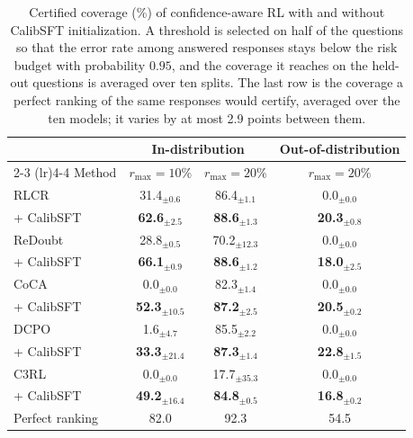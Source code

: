 \begin{table}[t]
    \centering
    \caption{Certified coverage (\%) of confidence-aware RL with and without CalibSFT initialization. A threshold is selected on half of the questions so that the error rate among answered responses stays below the risk budget with probability $0.95$, and the coverage it reaches on the held-out questions is averaged over ten splits. The last row is the coverage a perfect ranking of the same responses would certify, averaged over the ten models; it varies by at most 2.9 points between them.}
    \label{tab:risk_control}
    \footnotesize
    \setlength{\tabcolsep}{5pt}
    \begin{tabular}{lccc}
        \toprule
        & \multicolumn{2}{c}{In-distribution} & Out-of-distribution \\
        \cmidrule(lr){2-3} \cmidrule(lr){4-4}
        Method & $r_{\max}=10\%$ & $r_{\max}=20\%$ & $r_{\max}=20\%$ \\
        \midrule
        RLCR & 31.4$_{\pm 0.6}$ & 86.4$_{\pm 1.1}$ & 0.0$_{\pm 0.0}$ \\
        \rowcolor{calibrow} + CalibSFT & \textbf{62.6$_{\pm 2.5}$} & \textbf{88.6$_{\pm 1.3}$} & \textbf{20.3$_{\pm 0.8}$} \\
        \midrule
        ReDoubt & 28.8$_{\pm 0.5}$ & 70.2$_{\pm 12.3}$ & 0.0$_{\pm 0.0}$ \\
        \rowcolor{calibrow} + CalibSFT & \textbf{66.1$_{\pm 0.9}$} & \textbf{88.6$_{\pm 1.2}$} & \textbf{18.0$_{\pm 2.5}$} \\
        \midrule
        CoCA & 0.0$_{\pm 0.0}$ & 82.3$_{\pm 1.4}$ & 0.0$_{\pm 0.0}$ \\
        \rowcolor{calibrow} + CalibSFT & \textbf{52.3$_{\pm 10.5}$} & \textbf{87.2$_{\pm 2.5}$} & \textbf{20.5$_{\pm 0.2}$} \\
        \midrule
        DCPO & 1.6$_{\pm 4.7}$ & 85.5$_{\pm 2.2}$ & 0.0$_{\pm 0.0}$ \\
        \rowcolor{calibrow} + CalibSFT & \textbf{33.3$_{\pm 21.4}$} & \textbf{87.3$_{\pm 1.4}$} & \textbf{22.8$_{\pm 1.5}$} \\
        \midrule
        C3RL & 0.0$_{\pm 0.0}$ & 17.7$_{\pm 35.3}$ & 0.0$_{\pm 0.0}$ \\
        \rowcolor{calibrow} + CalibSFT & \textbf{49.2$_{\pm 16.4}$} & \textbf{84.8$_{\pm 0.5}$} & \textbf{16.8$_{\pm 0.2}$} \\
        \midrule
        Perfect ranking & 82.0 & 92.3 & 54.5 \\
        \bottomrule
    \end{tabular}
\end{table}
